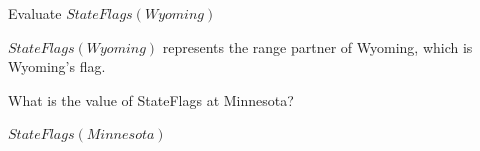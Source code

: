 \documentclass{ximera}
\begin{document}
\begin{question}

Evaluate $StateFlags(Wyoming)$

\begin{multipleChoice}
\end{multipleChoice}
\begin{feedback}
$StateFlags(Wyoming)$ represents the range partner of Wyoming, which is Wyoming's flag.
\end{feedback}
\end{question}






\begin{question}

What is the value of StateFlags at Minnesota?

\begin{multipleChoice}
\end{multipleChoice}
\begin{feedback}
$StateFlags(Minnesota)$ 
\end{feedback}
\end{question}
\end{document}
